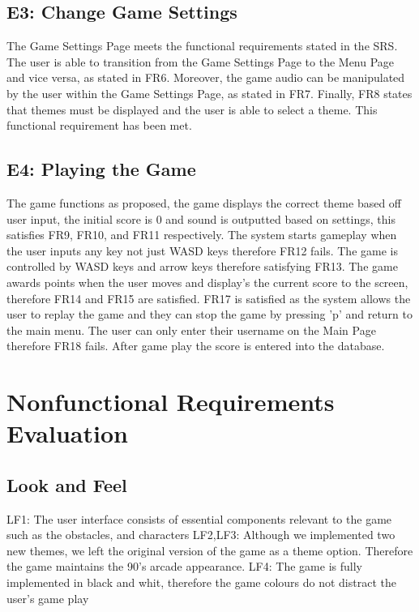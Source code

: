 \documentclass[12pt, titlepage]{article}
\begin{document}
\subsection{E3: Change Game Settings}
The Game Settings Page meets the functional requirements stated in the SRS. The user is able to transition from the Game Settings Page to the Menu Page and vice versa, as stated in FR6. Moreover, the game audio can be manipulated by the user within the Game Settings Page, as stated in FR7. Finally, FR8 states that themes must be displayed and the user is able to select a theme. This functional requirement has been met.

\subsection{E4: Playing the Game}
The game functions as proposed, the game displays the correct theme based off user input, the initial score is 0 and sound is outputted based on settings, this satisfies FR9, FR10, and FR11 respectively. The system starts gameplay when the user inputs any key not just WASD keys therefore FR12 fails. The game is controlled by WASD keys and arrow keys therefore satisfying FR13. The game awards points when the user moves and display's the current score to the screen, therefore FR14 and FR15 are satisfied. FR17 is satisfied as the system allows the user to replay the game and they can stop the game by pressing 'p' and return to the main menu. The user can only enter their username on the Main Page therefore FR18 fails. After game play the score is entered into the database. 


\section{Nonfunctional Requirements Evaluation}
\subsection{Look and Feel}	
LF1: The user interface consists of essential components relevant to the game such as the obstacles, and characters
LF2,LF3: Although we implemented two new themes, we left the original version of the game as a theme option. Therefore the game maintains the 90's arcade appearance.
LF4: The game is fully implemented in black and whit, therefore the  game colours do not distract the user's game play
\end{document}
